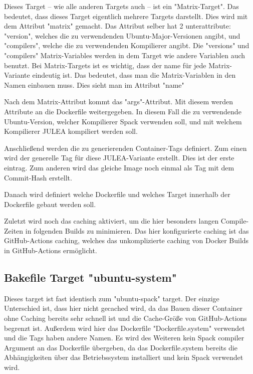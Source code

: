 Dieses Target – wie alle anderen Targets auch – ist ein "Matrix-Target". Das bedeutet, dass dieses Target eigentlich mehrere Targets darstellt. Dies wird mit dem Attribut "matrix" gemacht. Das Attribut selber hat 2 unterattribute: "version", welches die zu verwendenden Ubuntu-Major-Versionen angibt, und "compilers", welche die zu verwendenden Kompilierer angibt.
Die "versions" und "compilers" Matrix-Variables werden in dem Target wie andere Variablen auch benutzt. 
Bei Matrix-Targets ist es wichtig, dass der name für jede Matrix-Variante eindeutig ist. Das bedeutet, dass man die Matrix-Variablen in den Namen einbauen muss. Dies sieht man im Attribut "name"

Nach dem Matrix-Attribut kommt das "args"-Attribut. Mit diesem werden Attribute an die Dockerfile weitergegeben. In diesem Fall die zu verwendende Ubuntu-Version, welcher Kompilierer Spack verwenden soll, und mit welchem Kompilierer JULEA kompiliert werden soll. 

Anschließend werden die zu generierenden Container-Tags definiert. Zum einen wird der generelle Tag für diese JULEA-Variante erstellt. Dies ist der erste eintrag. Zum anderen wird das gleiche Image noch einmal als Tag mit dem Commit-Hash erstellt.

Danach wird definiert welche Dockerfile und welches Target innerhalb der Dockerfile gebaut werden soll. 

Zuletzt wird noch das caching aktiviert, um die hier besonders langen Compile-Zeiten in folgenden Builds zu minimieren. Das hier konfigurierte caching ist das GitHub-Actions caching, welches das unkomplizierte caching von Docker Builds in GitHub-Actions ermöglicht.

\subsection{Bakefile Target "ubuntu-system"}

Dieses target ist fast identisch zum "ubuntu-spack" target. Der einzige Unterschied ist, dass hier nicht gecached wird, da das Bauen dieser Container ohne Caching bereits sehr schnell ist und die Cache-Größe von GitHub-Actions begrenzt ist. Außerdem wird hier das Dockerfile "Dockerfile.system" verwendet und die Tags haben andere Namen. Es wird des Weiteren kein Spack compiler Argument an das Dockerfile übergeben, da das Dockerfile.system bereits die Abhängigkeiten über das Betriebssystem installiert und kein Spack verwendet wird. 

\inputminted[firstline=35,lastline=50]{./lexers/docker-bake-lexer.py}{./code-examples/docker-bake.hcl}

